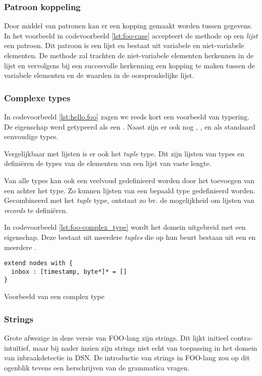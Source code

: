\subsubsection{Patroon koppeling}

Door middel van patronen kan er een kopping gemaakt worden tussen gegevens. In
het voorbeeld in codevoorbeeld \ref{lst:foo-case} accepteert de 
methode op een \emph{lijst} een patroon. Dit patroon is een lijst en bestaat
uit variabele en niet-variabele elementen. De  methode zal
trachten de niet-variabele elementen herkennen in de lijst en vervolgens bij
een succesvolle herkenning een kopping te maken tussen de variabele elementen
en de waarden in de oorspronkelijke lijst.

\subsubsection{Complexe types}

In codevoorbeeld \ref{lst:hello.foo} zagen we reeds kort een voorbeeld van typering.
De  eigenschap werd getypeerd als een . Naast
 zijn er ook nog , ,  en
 als standaard eenvoudige types.

Vergelijkbaar met lijsten is er ook het \emph{tuple} type. Dit zijn lijsten van
types en defini\"eren de types van de elementen van een lijst van vaste lengte.

Van alle types kan ook een veelvoud gedefinieerd worden door het toevoegen van
een \ttt{*} achter het type. Zo kunnen lijsten van een bepaald type
gedefinieerd worden. Gecombineerd met het \emph{tuple} type, ontstaat zo bv. de
mogelijkheid om lijsten van \emph{records} te defini\"eren.

In codevoorbeeld \ref{lst:foo-complex_type} wordt het  domein uitgebreid
met een  eigenschap. Deze bestaat uit meerdere \emph{tuples} die op
hun beurt bestaan uit een  en meerdere .

\begin{listing}[ht]
  \begin{verbatim}
extend nodes with {
  inbox : [timestamp, byte*]* = []
}
  \end{verbatim}
  \vspace{-5mm}
  \caption{Voorbeeld van een complex type}
  \label{lst:foo-complex_type}
\end{listing}

\subsubsection{Strings}

Grote afwezige in deze versie van FOO-lang zijn strings. Dit lijkt initieel
contra-intu\"itief, maar bij nader inzien zijn strings niet echt van toepassing
in het domein van inbraakdetectie in DSN. De introductie van strings in
FOO-lang zou op dit ogenblik tevens een herschrijven van de grammatica vragen.
